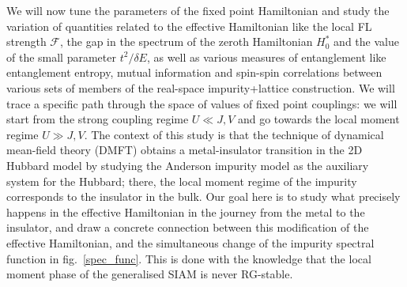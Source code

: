 \documentclass{report}
\numberwithin{equation}{section}
\begin{document}
We will now tune the parameters of the fixed point Hamiltonian and study the variation of quantities related to the effective Hamiltonian like the local FL strength \(\mathcal{F}\), the gap in the spectrum of the zeroth Hamiltonian \(H_0^*\) and the value of the small parameter \(t^2/\delta E\), as well as various measures of entanglement like entanglement entropy, mutual information and spin-spin correlations between various sets of members of the real-space impurity+lattice construction. We will trace a specific path through the space of values of fixed point couplings: we will start from the strong coupling regime \(U \ll J,V\) and go towards the local moment regime \(U \gg J,V\). The context of this study is that the technique of dynamical mean-field theory (DMFT) obtains a metal-insulator transition in the 2D Hubbard model by studying the Anderson impurity model as the auxiliary system for the Hubbard; there, the local moment regime of the impurity corresponds to the insulator in the bulk. Our goal here is to study what precisely happens in the effective Hamiltonian in the journey from the metal to the insulator, and draw a concrete connection between this modification of the effective Hamiltonian, and the simultaneous change of the impurity spectral function in fig.~\ref{spec_func}. This is done with the knowledge that the local moment phase of the generalised SIAM is never RG-stable.
\end{document}
